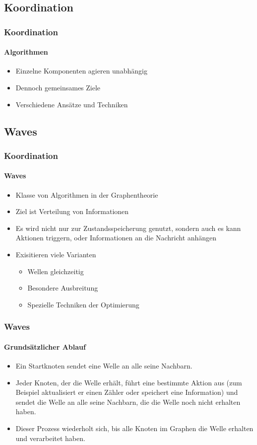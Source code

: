 \subsection{Koordination}
\begin{frame}
  \frametitle{Koordination}
  \framesubtitle{Algorithmen}
  \begin{itemize}
    \item Einzelne Komponenten agieren unabhängig
    \item Dennoch gemeinsames Ziele 
    \item Verschiedene Ansätze und Techniken
  \end{itemize}
\end{frame}

\subsection{Waves}
\begin{frame}
  \frametitle{Koordination}
  \framesubtitle{Waves}
  \begin{itemize}
    \item Klasse von Algorithmen in der Graphentheorie
    \item Ziel ist Verteilung von Informationen
    \item Es wird nicht nur zur Zustandsspeicherung genutzt, sondern auch es kann Aktionen triggern, oder Informationen an die Nachricht anhängen
    \item Exisitieren viele Varianten
    \begin{itemize}
      \item Wellen gleichzeitig
      \item Besondere Ausbreitung
      \item Spezielle Techniken der Optimierung
    \end{itemize}
  \end{itemize}
\end{frame}

\begin{frame}
  \frametitle{Waves}
  \framesubtitle{Grundsätzlicher Ablauf}
  \begin{itemize}
     \item Ein Startknoten sendet eine Welle an alle seine Nachbarn.
     \item Jeder Knoten, der die Welle erhält, führt eine bestimmte Aktion aus (zum Beispiel aktualisiert er einen Zähler oder speichert eine Information) und sendet die Welle an alle seine Nachbarn, die die Welle noch nicht erhalten haben.
     \item Dieser Prozess wiederholt sich, bis alle Knoten im Graphen die Welle erhalten und verarbeitet haben.
  \end{itemize}
\end{frame}

